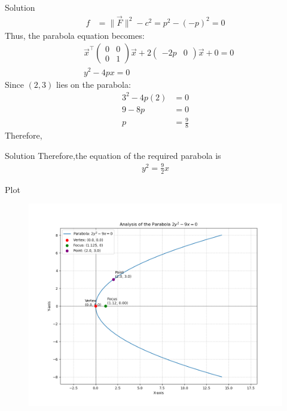 \documentclass{beamer}
\newcommand{\myvec}[1]{\ensuremath{\begin{pmatrix}#1\end{pmatrix}}}
\begin{document}
\begin{frame}{Solution}
 \begin{align}
 	f &= \|\vec{F}\|^2 - c^2 = p^2 - (-p)^2 = 0
 \end{align}
 Thus, the parabola equation becomes:
 \begin{align}
 	&\vec{x}^\top \myvec{0 & 0 \\ 0 & 1}\vec{x} 
 	+ 2\myvec{-2p & 0}\vec{x} + 0 = 0\\
 	&y^2 - 4px = 0
 \end{align}
 Since $(2,3)$ lies on the parabola:
 \begin{align}
 	3^2 - 4p(2) &= 0 \\
 	9 - 8p &= 0 \\
 	p &= \frac{9}{8}
 \end{align}
 Therefore,
\end{frame}

\begin{frame}{Solution}
Therefore,the equation of the required parabola is
\begin{align}
	y^2 = \frac{9}{2}x
\end{align}
\end{frame}


\begin{frame}{Plot}
\begin{figure}[H]
	\centering
	\includegraphics[width=1\linewidth]{figs/parabola}
\end{figure}


\end{frame}
\end{document}
